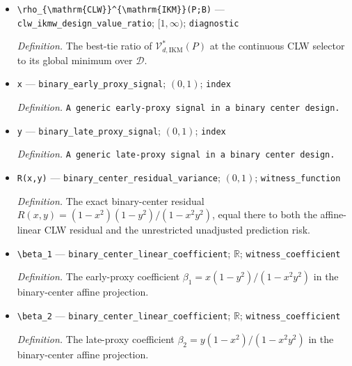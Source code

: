 \documentclass{article}
\begin{document}
\begin{itemize}
  \item \texttt{\textbackslash{}\allowbreak{}rho\_\allowbreak{}\{\textbackslash{}\allowbreak{}mathrm\{CLW\}\allowbreak{}\}\allowbreak{}\textasciicircum{}\{\textbackslash{}\allowbreak{}mathrm\{IKM\}\allowbreak{}\}\allowbreak{}(P;\allowbreak{}B)} --- \texttt{clw\_\allowbreak{}ikmw\_\allowbreak{}design\_\allowbreak{}value\_\allowbreak{}ratio}; \([1,\infty)\); \texttt{diagnostic}
  \par\smallskip\noindent\emph{Definition.} The best-tie ratio of \(\mathcal V_{d,\mathrm{IKM}}^*(P)\) at the continuous CLW selector to its global minimum over \(\mathcal D\).
  \item \texttt{x} --- \texttt{binary\_\allowbreak{}early\_\allowbreak{}proxy\_\allowbreak{}signal}; \((0,1)\); \texttt{index}
  \par\smallskip\noindent\emph{Definition.} \texttt{A generic early-\allowbreak{}proxy signal in a binary center design.}
  \item \texttt{y} --- \texttt{binary\_\allowbreak{}late\_\allowbreak{}proxy\_\allowbreak{}signal}; \((0,1)\); \texttt{index}
  \par\smallskip\noindent\emph{Definition.} \texttt{A generic late-\allowbreak{}proxy signal in a binary center design.}
  \item \texttt{R(x,\allowbreak{}y)} --- \texttt{binary\_\allowbreak{}center\_\allowbreak{}residual\_\allowbreak{}variance}; \((0,1)\); \texttt{witness\_\allowbreak{}function}
  \par\smallskip\noindent\emph{Definition.} The exact binary-center residual \(R(x,y)=(1-x^2)(1-y^2)/(1-x^2y^2)\), equal there to both the affine-linear CLW residual and the unrestricted unadjusted prediction risk.
  \item \texttt{\textbackslash{}\allowbreak{}beta\_\allowbreak{}1} --- \texttt{binary\_\allowbreak{}center\_\allowbreak{}linear\_\allowbreak{}coefficient}; \(\mathbb R\); \texttt{witness\_\allowbreak{}coefficient}
  \par\smallskip\noindent\emph{Definition.} The early-proxy coefficient \(\beta_1=x(1-y^2)/(1-x^2y^2)\) in the binary-center affine projection.
  \item \texttt{\textbackslash{}\allowbreak{}beta\_\allowbreak{}2} --- \texttt{binary\_\allowbreak{}center\_\allowbreak{}linear\_\allowbreak{}coefficient}; \(\mathbb R\); \texttt{witness\_\allowbreak{}coefficient}
  \par\smallskip\noindent\emph{Definition.} The late-proxy coefficient \(\beta_2=y(1-x^2)/(1-x^2y^2)\) in the binary-center affine projection.

\end{itemize}
\end{document}
